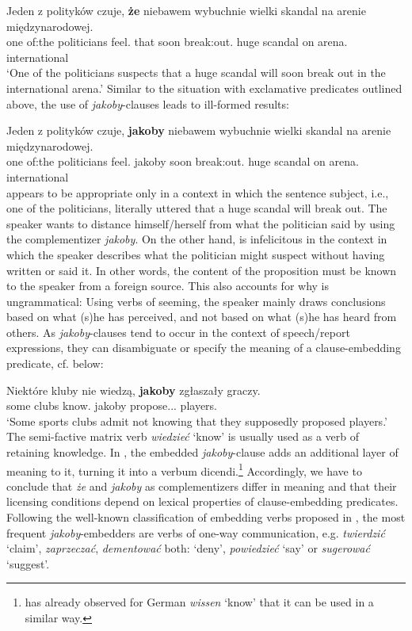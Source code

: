 \documentclass[output=paper
,modfonts
,nonflat]{langsci/langscibook}
\begin{document}
\ea \gll Jeden z polityków czuje, \textbf{że} niebawem wybuchnie wielki skandal na arenie międzynarodowej. \\
		one {of:the} politicians feel.{\thirdperson}{\sg} that soon {break:out}.{\thirdperson}{\sg} huge scandal on arena.{\loc} international \\  
\glt	`One of the politicians suspects that a huge scandal will soon break out in the international arena.'  
\z  
Similar to the situation with exclamative predicates outlined above, the use of \emph{jakoby}-clauses leads to ill-formed results:

\ea \gll *Jeden z polityków czuje, \textbf{jakoby} niebawem wybuchnie wielki skandal na arenie międzynarodowej. \label{czuc} \\
		one {of:the} politicians feel.{\thirdperson}{\sg} jakoby soon {break:out}.{\thirdperson}{\sg} huge scandal on arena.{\loc} international \\    
\z  
{} appears to be appropriate only in a context in which the sentence subject, i.e., one of the politicians, literally uttered that a huge scandal will break out. The speaker wants to distance himself\slash herself from what the politician said by using the complementizer \emph{jakoby}. On the other hand,   is infelicitous in the context in which the speaker describes what the politician might suspect without having written or said it. In other words, the content of the proposition must be known to the speaker from a foreign source. This also accounts for why  is ungrammatical: Using verbs of seeming, the speaker mainly draws conclusions based on what (s)he has perceived, and not based on what (s)he has heard from others. As \emph{jakoby}-clauses tend to occur in the context of speech\slash report expressions, they can disambiguate or specify the meaning of a clause-embedding predicate, cf.  below:

\ea \gll Niektóre kluby nie wiedzą, \textbf{jakoby} zgłaszały graczy. \label{wiedziec} \\
		some clubs {\negation} know.{\thirdperson}{\pl} jakoby propose.{\lptcp}.{\nvir}.{\pl} players.{\acc} \\
\glt	`Some sports clubs admit not knowing that they supposedly proposed players.'  
\z
The semi-factive matrix verb \emph{wiedzieć} `know' is usually used as a verb of retaining knowledge. In , the embedded \emph{jakoby}-clause adds an additional layer of meaning to it, turning it into a verbum dicendi.\footnote{\textcite[142--148]{Reis1977} has already observed for German \emph{wissen} `know' that it can be used in a similar way.} 
Accordingly, we have to conclude that \emph{że} and \emph{jakoby} as complementizers differ in meaning and that their licensing conditions depend on lexical properties of clause-embedding predicates. Following the well-known classification of embedding verbs proposed in \textcite{Karttunen1977}, the most frequent \emph{jakoby}-embedders are verbs of one-way communication, e.g. \emph{twierdzić} `claim', \emph{zaprzeczać}, \emph{dementować} both: `deny', \emph{powiedzieć} `say' or \emph{sugerować} `suggest'.
\end{document}
